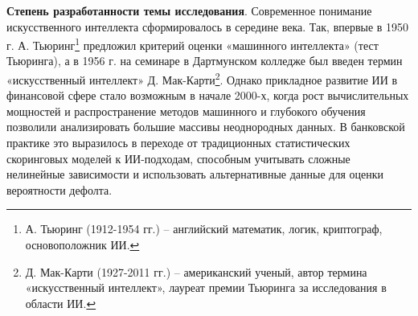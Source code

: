 	
	\textbf{Степень разработанности темы исследования}. 	Современное понимание искусственного интеллекта сформировалось в середине  века. Так, впервые в 1950 г. А. Тьюринг\footnote{А. Тьюринг (1912-1954 гг.) -- английский математик, логик, криптограф, основоположник ИИ.} предложил критерий оценки «машинного интеллекта» (тест Тьюринга), а в 1956 г. на семинаре в Дартмунском колледже был введен термин «искусственный интеллект» Д. Мак-Карти\footnote{Д. Мак-Карти (1927-2011 гг.) -- американский ученый, автор термина «искусственный интеллект», лауреат премии Тьюринга за исследования в области ИИ.}. Однако прикладное развитие ИИ в финансовой сфере стало возможным в начале 2000-х, когда рост вычислительных мощностей и распространение методов машинного и глубокого обучения позволили анализировать большие массивы неоднородных данных. В банковской практике это выразилось в переходе от традиционных статистических скоринговых моделей к ИИ-подходам, способным учитывать сложные нелинейные зависимости и использовать альтернативные данные для оценки вероятности дефолта.
	

